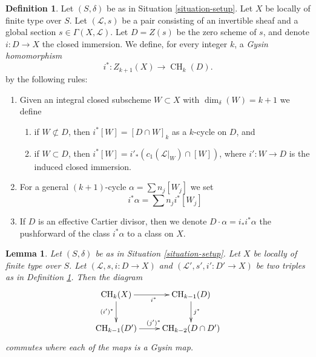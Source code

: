 \documentclass{amsart}
\theoremstyle{plain}
\newtheorem{lemma}[subsection]{Lemma}
\theoremstyle{definition}
\newtheorem{definition}[subsection]{Definition}
\theoremstyle{remark}
\numberwithin{equation}{subsection}
\def\CH{\mathop{\mathrm{CH}}\nolimits}
\begin{document}
\begin{definition}
\label{definition-gysin-homomorphism}
Let $(S, \delta)$ be as in Situation \ref{situation-setup}.
Let $X$ be locally of finite type over $S$.
Let $(\mathcal{L}, s)$ be a pair consisting of an invertible
sheaf and a global section $s \in \Gamma(X, \mathcal{L})$.
Let $D = Z(s)$ be the zero scheme of $s$, and
denote $i : D \to X$ the closed immersion.
We define, for every integer $k$, a {\it Gysin homomorphism}
$$
i^* : Z_{k + 1}(X) \to \CH_k(D).
$$
by the following rules:
\begin{enumerate}
\item Given an integral closed subscheme $W \subset X$ with
$\dim_\delta(W) = k + 1$ we define
\begin{enumerate}
\item if $W \not \subset D$, then $i^*[W] = [D \cap W]_k$ as a
$k$-cycle on $D$, and
\item if $W \subset D$, then
$i^*[W] = i'_*(c_1(\mathcal{L}|_W) \cap [W])$,
where $i' : W \to D$ is the induced closed immersion.
\end{enumerate}
\item For a general $(k + 1)$-cycle $\alpha = \sum n_j[W_j]$
we set
$$
i^*\alpha = \sum n_j i^*[W_j]
$$
\item If $D$ is an effective Cartier divisor, then we denote
$D \cdot \alpha = i_*i^*\alpha$ the pushforward of the class $i^*\alpha$
to a class on $X$.
\end{enumerate}
\end{definition}

\begin{lemma}
\label{lemma-gysin-commutes-gysin}
Let $(S, \delta)$ be as in Situation \ref{situation-setup}. Let $X$ be locally
of finite type over $S$. Let $(\mathcal{L}, s, i : D \to X)$ and
$(\mathcal{L}', s', i' : D' \to X)$ be two triples as in
Definition \ref{definition-gysin-homomorphism}. Then the diagram
$$
\xymatrix{
\CH_k(X) \ar[r]_{i^*} \ar[d]_{(i')^*} & \CH_{k - 1}(D) \ar[d]^{j^*} \\
\CH_{k - 1}(D') \ar[r]^{(j')^*} & \CH_{k - 2}(D \cap D')
}
$$
commutes where each of the maps is a Gysin map.
\end{lemma}
\end{document}
